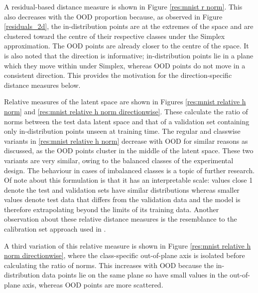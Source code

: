 \documentclass{article}
\begin{document}
A residual-based distance measure is shown in Figure \ref{res:mnist r norm}. This also decreases with the OOD proportion because, as observed in Figure \ref{residuals_2d}, the in-distribution points are at the extremes of the space and are clustered toward the centre of their respective classes under the Simplex approximation. The OOD points are already closer to the centre of the space. It is also noted that the direction is informative; in-distribution points lie in a plane which they move within under Simplex, whereas OOD points do not move in a consistent direction. This provides the motivation for the direction-specific distance measures below.

Relative measures of the latent space are shown in Figures \ref{res:mnist relative h norm} and \ref{res:mnist relative h norm directionwise}.
These calculate the ratio of norms between the test data latent space and that of a validation set containing only in-distribution points unseen at training time.
The regular and classwise variants in \ref{res:mnist relative h norm} decrease with OOD for similar reasons as discussed, as the OOD points cluster in the middle of the latent space. These two variants are very similar, owing to the balanced classes of the experimental design. The behaviour in cases of imbalanced classes is a topic of further research. Of note about this formulation is that it has an interpretable scale: values close 1 denote the test and validation sets have similar distributions whereas smaller values denote test data that differs from the validation data and the model is therefore extrapolating beyond the limits of its training data. Another observation about these relative distance measures is the resemblance to the calibration set approach used in \cite{papernot_deep_2018}.

A third variation of this relative measure is shown in Figure \ref{res:mnist relative h norm directionwise}, where the class-specific out-of-plane axis is isolated before calculating the ratio of norms. This increases with OOD because the in-distribution data points lie on the same plane so have small values in the out-of-plane axis, whereas OOD points are more scattered.
\end{document}
